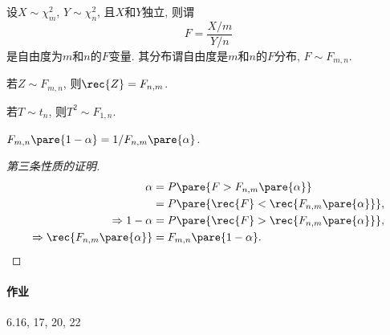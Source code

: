 \documentclass{ctexart}
\begin{document}
设$X\sim \chi_m^2$, $Y\sim \chi_n^2$, 且$X$和$Y$独立, 则谓
\[ F = \frac{X/m}{Y/n} \]
是自由度为$m$和$n$的$F$变量. 其分布谓自由度是$m$和$n$的$F$分布, $F\sim F_{m,n}$.

\begin{corollary}[$F$-分布的性质]
    \mbox{}
    \begin{cenum}
        \item 若$Z\sim F_{m,n}$, 则$\rec{Z} = F_{n,m}$.
        \item 若$T\sim t_n$, 则$T^2 \sim F_{1,n}$.
        \item $F_{m,n}\pare{1-\alpha} = 1/F_{n,m}\pare{\alpha}$.
    \end{cenum}
\end{corollary}
\begin{proof}[第三条性质的证明]
    \begin{align*}
         \alpha &= P\pare{F>F_{n,m}\pare{\alpha}} \\
         &= P\pare{\rec{F} < \rec{F_{n,m}\pare{\alpha}}}, \\
         \Rightarrow 1-\alpha &= P\pare{\rec{F} > \rec{F_{n,m}\pare{\alpha}}}, \\
         \Rightarrow \rec{F_{n,m}\pare{\alpha}} &= F_{m,n}\pare{1-\alpha}. \qedhere
    \end{align*} 
\end{proof}


\paragraph{作业} %
\label{par:作业}

6.16, 17, 20, 22




\end{document}
